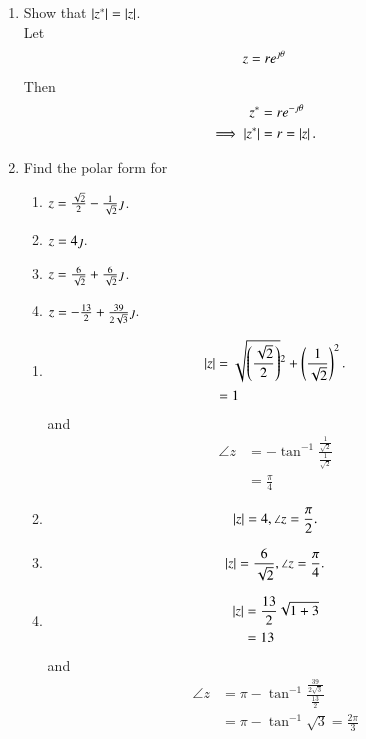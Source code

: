 \begin{enumerate}[label=\arabic*.,ref=\thesubsection.\theenumi]
\begin{enumerate}
\end{enumerate}
\item Show that $\left\vert z^{*}\right\vert = \left\vert z\right\vert$.
\\
\solution Let 
\begin{align}
	z = re^{\jmath\theta}
\end{align}
Then 
\begin{align}
	z^{*} &= re^{-\jmath\theta}
	\\
	\implies \left\vert z^{*}\right\vert &= r = \left\vert z\right\vert.
\end{align}
\item Find the polar form for 
\begin{enumerate}
	\item $z = \frac{\sqrt{2}}{2}-\frac{1}{\sqrt{2}}\jmath$.
	\item $z = 4\jmath$.
	\item $z = \frac{6}{\sqrt{2}}+ \frac{6}{\sqrt{2}}\jmath$.
	\item $z = -\frac{13}{2}+\frac{39}{2\sqrt{3}}\jmath$.
\end{enumerate}
\solution 
\begin{enumerate}
	\item 
		\begin{align}
			\left\vert z\right\vert &= \sqrt{\left(\frac{\sqrt{2}}{2}\right)}^2 + \left(\frac{1}{\sqrt{2}}\right)^2.
			\\
			&= 1
		\end{align}
		and 
		\begin{align}
			\angle{z} &= - \tan^{-1} \frac{\frac{1}{\sqrt{2}}}{\frac{1}{\sqrt{2}}}
			\\
			&= \frac{\pi}{4}
		\end{align}
	\item 
		\begin{align}
			\left\vert z\right\vert = 4, \angle{z} = \frac{\pi}{2}.
		\end{align}
	\item 
		\begin{align}
			\left\vert z\right\vert = \frac{6}{\sqrt{2}}, \angle{z} =  \frac{\pi}{4}.
		\end{align}
	\item 
		\begin{align}
			\left\vert z\right\vert &= \frac{13}{2}\sqrt{1 + 3}
			\\
			&= 13
		\end{align}
		and 
		\begin{align}
			\angle{z} &= \pi - \tan^{-1}\frac{\frac{39}{2\sqrt{3}}}{\frac{13}{2}}
			\\
			&= \pi - \tan^{-1}\sqrt{3} = \frac{2\pi}{3}
		\end{align}

\end{enumerate}
\end{enumerate}
